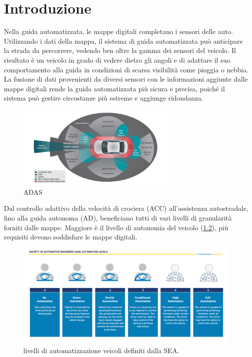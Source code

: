 \chapter{Introduzione}
\label{cap:intro}

Nella guida automatizzata, le mappe digitali completano i sensori delle auto. Utilizzando i dati della mappa, il sistema di guida automatizzata può anticipare la strada da percorrere, vedendo ben oltre la gamma dei sensori del veicolo. Il risultato è un veicolo in grado di vedere dietro gli angoli e di adattare il suo comportamento alla guida in condizioni di scarsa visibilità come pioggia o nebbia. La fusione di dati provenienti da diversi sensori con le  informazioni aggiunte dalle mappe digitali rende la guida automatizzata più sicura e precisa, poiché il sistema può gestire circostanze più estreme e aggiunge ridondanza.
\begin{figure}[H]
        \begin{center}
            \includegraphics[width=0.7\textwidth]{Immagini/adas.jpg}
        \end{center}
    \caption{ADAS}
\label{fig:ADAS}
\end{figure}

Dal controllo adattivo della velocità di crociera (ACC) all'assistenza autostradale, fino alla guida autonoma (AD), beneficiano tutti di vari livelli di granularità forniti dalle mappe. Maggiore è il livello di autonomia del veicolo (\ref{fig:SEA}), più requisiti devono soddisfare le mappe digitali.

\begin{figure}[H]
        \centering
        \includegraphics[width=1.1\textwidth]{Immagini/levels.png}
        \caption{livelli di automatizzazione veicoli definiti dalla SEA.}
        \label{fig:SEA}
    \end{figure}

